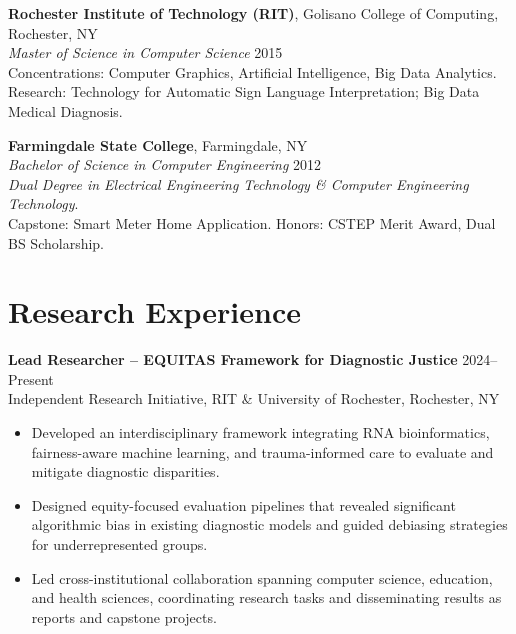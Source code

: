 \documentclass[11pt,letterpaper]{article}
\begin{document}
\vspace{4pt}
\textbf{Rochester Institute of Technology (RIT)}, Golisano College of Computing, Rochester, NY\\
\textit{Master of Science in Computer Science} \hfill 2015\\
Concentrations: Computer Graphics, Artificial Intelligence, Big Data Analytics.\\
Research: Technology for Automatic Sign Language Interpretation; Big Data Medical Diagnosis.

\vspace{4pt}
\textbf{Farmingdale State College}, Farmingdale, NY\\
\textit{Bachelor of Science in Computer Engineering} \hfill 2012\\
\textit{Dual Degree in Electrical Engineering Technology \& Computer Engineering Technology}.\\
Capstone: Smart Meter Home Application. Honors: CSTEP Merit Award, Dual BS Scholarship.

\section{Research Experience}

\textbf{Lead Researcher – EQUITAS Framework for Diagnostic Justice} \hfill 2024–Present\\
Independent Research Initiative, RIT \& University of Rochester, Rochester, NY
\begin{itemize}
    \item Developed an interdisciplinary framework integrating RNA bioinformatics, fairness-aware machine learning, and trauma-informed care to evaluate and mitigate diagnostic disparities.
    \item Designed equity-focused evaluation pipelines that revealed significant algorithmic bias in existing diagnostic models and guided debiasing strategies for underrepresented groups.
    \item Led cross-institutional collaboration spanning computer science, education, and health sciences, coordinating research tasks and disseminating results as reports and capstone projects.
\end{itemize}
\end{document}
